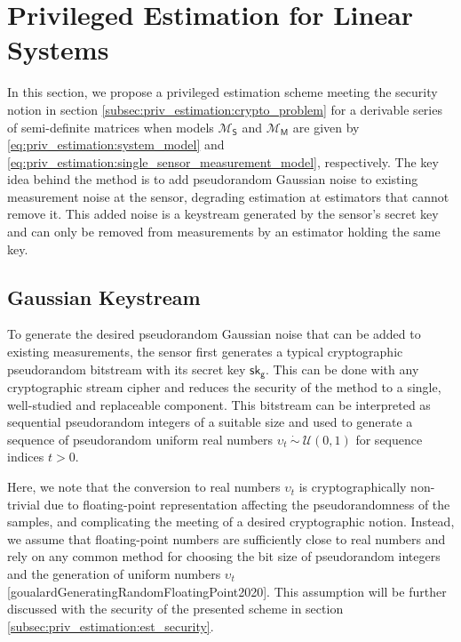\section{Privileged Estimation for Linear Systems}\label{sec:priv_estimation:privileged_estimation}
In this section, we propose a privileged estimation scheme meeting the security notion in section \ref{subsec:priv_estimation:crypto_problem} for a derivable series of semi-definite matrices when models $\mathcal{M}_{\mathsf{S}}$ and $\mathcal{M}_{\mathsf{M}}$ are given by \eqref{eq:priv_estimation:system_model} and \eqref{eq:priv_estimation:single_sensor_measurement_model}, respectively. The key idea behind the method is to add pseudorandom Gaussian noise to existing measurement noise at the sensor, degrading estimation at estimators that cannot remove it. This added noise is a keystream generated by the sensor's secret key and can only be removed from measurements by an estimator holding the same key.

% 
% 

\subsection{Gaussian Keystream}\label{subsec:priv_estimation:est_gaussian_keystream}
To generate the desired pseudorandom Gaussian noise that can be added to existing measurements, the sensor first generates a typical cryptographic pseudorandom bitstream with its secret key $\mathsf{sk}_{\mathsf{g}}$. This can be done with any cryptographic stream cipher and reduces the security of the method to a single, well-studied and replaceable component. This bitstream can be interpreted as sequential pseudorandom integers of a suitable size and used to generate a sequence of pseudorandom uniform real numbers $\upsilon_t\ \dot{\sim}\ \mathcal{U}(0,1)$ for sequence indices $t>0$.

Here, we note that the conversion to real numbers $\upsilon_t$ is cryptographically non-trivial due to floating-point representation affecting the pseudorandomness of the samples, and complicating the meeting of a desired cryptographic notion. Instead, we assume that floating-point numbers are sufficiently close to real numbers and rely on any common method for choosing the bit size of pseudorandom integers and the generation of uniform numbers $\upsilon_t$ [goualardGeneratingRandomFloatingPoint2020]. This assumption will be further discussed with the security of the presented scheme in section \ref{subsec:priv_estimation:est_security}.

